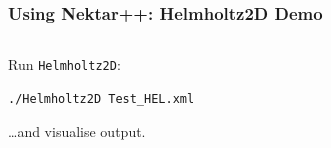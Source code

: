 \documentclass{beamer}
\numberwithin{figure}{section}
\numberwithin{equation}{section}
\begin{document}
\begin{frame}[fragile]
\frametitle{Using Nektar++: Helmholtz2D Demo}
\begin{minipage}[c][0.8\textheight][t]{\linewidth}
\begin{columns}
\begin{column}[l]{11.5cm}
Run \texttt{Helmholtz2D}:
\begin{verbatim}
./Helmholtz2D Test_HEL.xml
\end{verbatim}
\ldots and visualise output.
\end{column}
\end{columns}
\end{minipage}
\end{frame}

% 
% 
\end{document}
